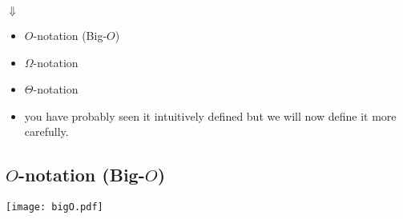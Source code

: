\documentclass[11pt]{article}
\begin{document}
$\Downarrow$

\begin{itemize}
\item $O$-notation (Big-$O$)
\item $\Omega$-notation
\item $\Theta$-notation

\item you have probably seen it intuitively defined but we will now
  define it more carefully.
\end{itemize}





\newpage
\subsection{$O$-notation (Big-$O$)}



\texttt{[image: bigO.pdf]}
\end{document}
